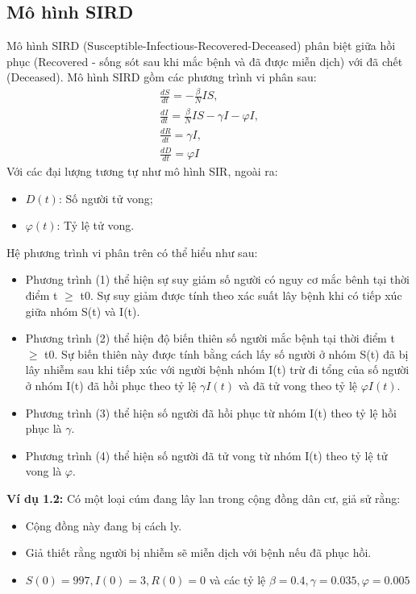 \documentclass[a4paper]{article}
\begin{document}
\subsection{Mô hình SIRD}
Mô hình SIRD (Susceptible-Infectious-Recovered-Deceased) phân biệt giữa hồi phục (Recovered - sống sót sau khi mắc bệnh và đã được miễn dịch) với đã chết (Deceased). Mô hình SIRD gồm các phương trình vi phân sau: 
\begin{align}
    \frac{dS}{dt} = -\frac{\beta}{N}IS,
    \\
    \frac{dI}{dt} = \frac{\beta}{N}IS - \gamma I - \varphi I,
    \\
    \frac{dR}{dt} = \gamma I,
    \\
    \frac{dD}{dt} = \varphi I
\end{align}
Với các đại lượng tương tự như mô hình SIR, ngoài ra:
\begin{itemize}
    \item $D(t)$: Số người tử vong;
    \item $\varphi(t)$: Tỷ lệ tử vong.
\end{itemize}
Hệ phương trình vi phân trên có thể hiểu như sau:
\begin{itemize}
    \item Phương trình (1) thể hiện sự suy giảm số người có nguy cơ mắc bênh tại thời điểm t $\geq$ t0. Sự suy giảm được tính theo xác suất lây bệnh khi có tiếp xúc giữa nhóm S(t) và I(t).
    \item Phương trình (2) thể hiện độ biến thiên số người mắc bệnh tại thời điểm t $\geq$ t0. Sự biến thiên này được tính bằng cách lấy số người ở nhóm S(t) đã bị lây nhiễm sau khi tiếp xúc với người bệnh nhóm I(t) trừ đi tổng của số người ở nhóm I(t) đã hồi phục theo tỷ lệ $\gamma I(t)$ và đã tử vong theo tỷ lệ $\varphi I(t)$.
    \item Phương trình (3) thể hiện số người đã hồi phục từ nhóm I(t) theo tỷ lệ hồi phục là $\gamma$.
    \item Phương trình (4) thể hiện số người đã tử vong từ nhóm I(t) theo tỷ lệ tử vong là $\varphi$.
\end{itemize}
\textbf{Ví dụ 1.2:} Có một loại cúm đang lây lan trong cộng đồng dân cư, giả sử rằng:
\begin{itemize}
    \item Cộng đồng này đang bị cách ly.
    \item  Giả thiết rằng người bị nhiễm sẽ miễn dịch với bệnh nếu đã phục hồi.
    \item $S(0) = 997, I(0) = 3, R(0) = 0$ và các tỷ lệ $\beta = 0.4, \gamma = 0.035, \varphi = 0.005$
\end{itemize}
\end{document}

